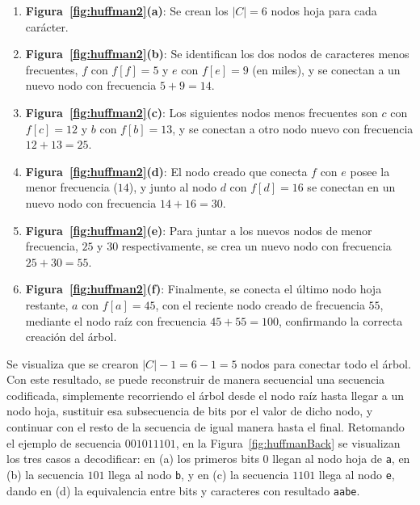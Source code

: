 \begin{enumerate}
	\item \textbf{Figura~\ref{fig:huffman2}(a)}: Se crean los $|C| = 6$ nodos hoja para cada carácter.
	\item \textbf{Figura~\ref{fig:huffman2}(b)}: Se identifican los dos nodos de caracteres menos frecuentes, $f$ con $f[f] = 5$ y $e$ con $f[e] = 9$ (en miles), y se conectan a un nuevo nodo con frecuencia $5 + 9 = 14$.
	\item \textbf{Figura~\ref{fig:huffman2}(c)}: Los siguientes nodos menos frecuentes son $c$ con $f[c] = 12$ y $b$ con $f[b] = 13$, y se conectan a otro nodo nuevo con frecuencia $12 + 13 = 25$.
	\item \textbf{Figura~\ref{fig:huffman2}(d)}: El nodo creado que conecta $f$ con $e$ posee la menor frecuencia ($14$), y junto al nodo $d$ con $f[d] = 16$ se conectan en un nuevo nodo con frecuencia $14 + 16 = 30$.
	\item \textbf{Figura~\ref{fig:huffman2}(e)}: Para juntar a los nuevos nodos de menor frecuencia, $25$ y $30$ respectivamente, se crea un nuevo nodo con frecuencia $25 + 30 = 55$.
	\item \textbf{Figura~\ref{fig:huffman2}(f)}: Finalmente, se conecta el último nodo hoja restante, $a$ con $f[a] = 45$, con el reciente nodo creado de frecuencia $55$, mediante el nodo raíz con frecuencia $45 + 55 = 100$, confirmando la correcta creación del árbol.
\end{enumerate}

Se visualiza que se crearon $|C| - 1 = 6 - 1 = 5$ nodos para conectar todo el árbol. Con este resultado, se puede reconstruir de manera secuencial una secuencia codificada, simplemente recorriendo el árbol desde el nodo raíz hasta llegar a un nodo hoja, sustituir esa subsecuencia de bits por el valor de dicho nodo, y continuar con el resto de la secuencia de igual manera hasta el final. Retomando el ejemplo de secuencia $001011101$, en la Figura~\ref{fig:huffmanBack} se visualizan los tres casos a decodificar: en (a) los primeros bits $0$ llegan al nodo hoja de \texttt{a}, en (b) la secuencia $101$ llega al nodo \texttt{b}, y en (c) la secuencia $1101$ llega al nodo \texttt{e}, dando en (d) la equivalencia entre bits y caracteres con resultado \texttt{aabe}.

%






